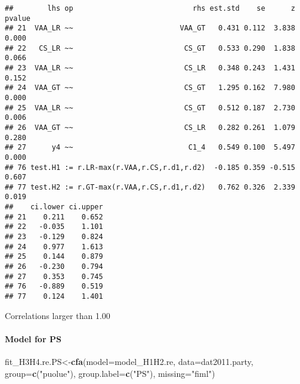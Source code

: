 \documentclass[
]{article}
\newenvironment{Shaded}{\begin{snugshade}}{\end{snugshade}}
\newcommand{\DataTypeTok}[1]{\textcolor[rgb]{0.13,0.29,0.53}{#1}}
\newcommand{\KeywordTok}[1]{\textcolor[rgb]{0.13,0.29,0.53}{\textbf{#1}}}
\newcommand{\NormalTok}[1]{#1}
\newcommand{\OperatorTok}[1]{\textcolor[rgb]{0.81,0.36,0.00}{\textbf{#1}}}
\newcommand{\StringTok}[1]{\textcolor[rgb]{0.31,0.60,0.02}{#1}}
\begin{document}
\begin{Shaded}
\end{Shaded}

\begin{verbatim}
##        lhs op                            rhs est.std    se      z pvalue
## 21  VAA_LR ~~                         VAA_GT   0.431 0.112  3.838  0.000
## 22   CS_LR ~~                          CS_GT   0.533 0.290  1.838  0.066
## 23  VAA_LR ~~                          CS_LR   0.348 0.243  1.431  0.152
## 24  VAA_GT ~~                          CS_GT   1.295 0.162  7.980  0.000
## 25  VAA_LR ~~                          CS_GT   0.512 0.187  2.730  0.006
## 26  VAA_GT ~~                          CS_LR   0.282 0.261  1.079  0.280
## 27      y4 ~~                           C1_4   0.549 0.100  5.497  0.000
## 76 test.H1 := r.LR-max(r.VAA,r.CS,r.d1,r.d2)  -0.185 0.359 -0.515  0.607
## 77 test.H2 := r.GT-max(r.VAA,r.CS,r.d1,r.d2)   0.762 0.326  2.339  0.019
##    ci.lower ci.upper
## 21    0.211    0.652
## 22   -0.035    1.101
## 23   -0.129    0.824
## 24    0.977    1.613
## 25    0.144    0.879
## 26   -0.230    0.794
## 27    0.353    0.745
## 76   -0.889    0.519
## 77    0.124    1.401
\end{verbatim}

Correlations larger than 1.00

\newpage

\hypertarget{model-for-ps}{%
\paragraph{Model for PS}\label{model-for-ps}}

\begin{Shaded}
\begin{Highlighting}[]
\NormalTok{fit_H3H4.re.PS<-}\KeywordTok{cfa}\NormalTok{(}\DataTypeTok{model=}\NormalTok{model_H1H2.re,}
                    \DataTypeTok{data=}\NormalTok{dat2011.party,}
                    \DataTypeTok{group=}\KeywordTok{c}\NormalTok{(}\StringTok{"puolue"}\NormalTok{),}
                    \DataTypeTok{group.label=}\KeywordTok{c}\NormalTok{(}\StringTok{"PS"}\NormalTok{),}
                    \DataTypeTok{missing=}\StringTok{"fiml"}\NormalTok{)}
\end{Highlighting}
\end{Shaded}
\end{document}
